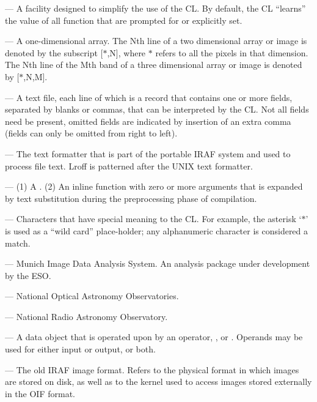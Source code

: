 \medskip \noindent {} --- A facility designed
to simplify the use of the CL. By default, the CL ``learns'' the value of all
function  that are prompted for or explicitly set.

\medskip \noindent {} --- A one-dimensional array. The Nth line
of a two dimensional array or image is denoted
by the subscript [$*$,N],
where $*$ refers to all the pixels in that dimension.
The Nth line of the Mth band of a three dimensional array or image
is denoted by [$*$,N,M].

\medskip \noindent {} --- A text file, each
line of which is a record that contains one or more fields, separated
by blanks or commas, that can be interpre\-ted by the CL.
Not all fields need be present, omitted fields are indicated by insertion
of an extra comma (fields can only be omitted
from right to left).

\medskip \noindent {} --- The text formatter that is part of
the portable IRAF system and used to process  file text. 
Lroff is patterned after the UNIX  text formatter.

\medskip \noindent {} --- (1) A .
(2) An inline function with zero or more arguments that is 
expanded by text substitution during the preprocessing phase
of compilation.

\medskip \noindent {} --- Characters that have special
meaning to the CL. For example, the asterisk `$*$' is used as a ``wild card''
place-holder; any alphanumeric character is considered a match.

\medskip \noindent {} --- Munich Image Data Analysis System.
An analysis package under development by the ESO.

\medskip \noindent {} --- National Optical Astronomy
Observatories.

\medskip \noindent {} --- National Radio Astronomy Observatory.

\medskip \noindent {} --- A data object that is
operated upon by an operator, , or .
Operands may be used for either input or output, or both.

\medskip \noindent {} --- The old IRAF image format.  Refers to the
physical format in which images are stored on disk, as well as to the
 kernel used to access images stored externally in the OIF format.

